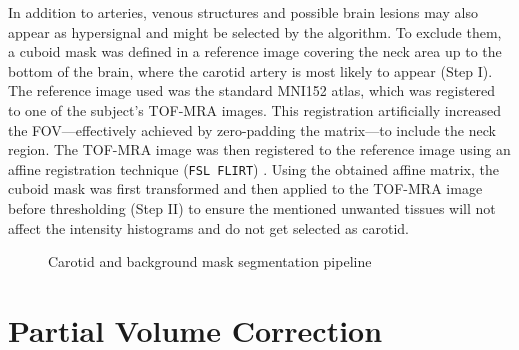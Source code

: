 In addition to arteries, venous structures and possible brain lesions may also appear as hypersignal and might be selected by the algorithm.
To exclude them, a cuboid mask was defined in a reference image covering the neck area up to the bottom of the brain, where the carotid artery is most likely to appear (Step I).
The reference image used was the standard MNI152 atlas, which was registered to one of the subject's TOF-MRA images.
This registration artificially increased the FOV---effectively achieved by zero-padding the matrix---to include the neck region.
The TOF-MRA image was then registered to the reference image using an affine registration technique (\texttt{\small FSL FLIRT}) \cite{jenkinson2012fsl}.
Using the obtained affine matrix, the cuboid mask was first transformed and then applied to the TOF-MRA image before thresholding (Step II) to ensure the mentioned unwanted tissues will not affect the intensity histograms and do not get selected as carotid.

\begin{figure}[h]
	\centering
	\caption{Carotid and background mask segmentation pipeline}
	\label{fig:seg_pipeline}
\end{figure}

\section{Partial Volume Correction}
